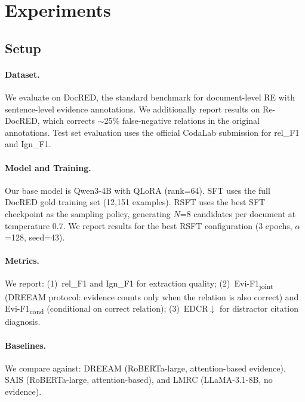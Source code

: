 \documentclass[11pt,a4paper]{article}
\newcommand{\edcr}{EDCR}
\newcommand{\rsft}{RSFT}
\begin{document}
\section{Experiments}
\label{sec:experiments}

\subsection{Setup}

\paragraph{Dataset.}
We evaluate on DocRED, the standard benchmark for document-level RE with sentence-level evidence annotations.
We additionally report results on Re-DocRED, which corrects ${\sim}$25\% false-negative relations in the original annotations.
Test set evaluation uses the official CodaLab submission for rel\_F1 and Ign\_F1.

\paragraph{Model and Training.}
Our base model is Qwen3-4B with QLoRA (rank=64).
SFT uses the full DocRED gold training set (12,151 examples).
\rsft{} uses the best SFT checkpoint as the sampling policy, generating $N$=8 candidates per document at temperature 0.7.
We report results for the best \rsft{} configuration (3 epochs, $\alpha$=128, seed=43).

\paragraph{Metrics.}
We report: (1)~rel\_F1 and Ign\_F1 for extraction quality; (2)~Evi-F1\textsubscript{joint} (DREEAM protocol: evidence counts only when the relation is also correct) and Evi-F1\textsubscript{cond} (conditional on correct relation); (3)~\edcr{}$\downarrow$ for distractor citation diagnosis.

\paragraph{Baselines.}
We compare against: DREEAM (RoBERTa-large, attention-based evidence), SAIS (RoBERTa-large, attention-based), and LMRC (LLaMA-3.1-8B, no evidence).
\end{document}
